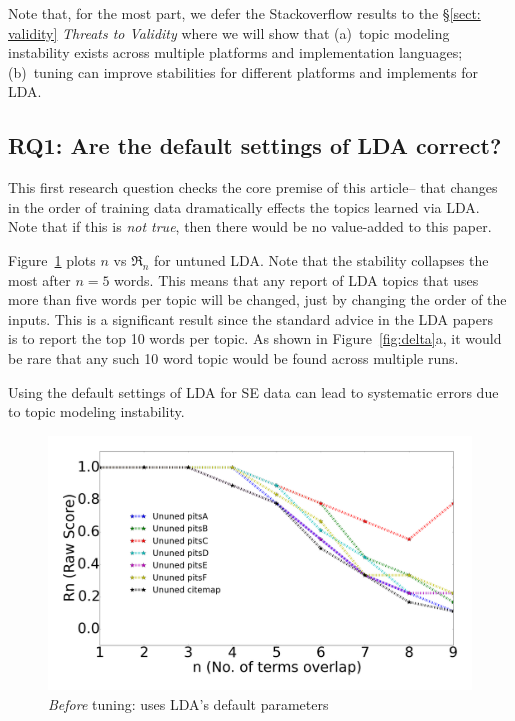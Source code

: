 \documentclass[10pt,conference]{IEEEtran}
\theoremstyle{break}
\begin{document}
  Note that, for the most part, we defer the Stackoverflow results to the \S\ref{sect: validity} {\em Threats to Validity} where we will show that (a)~topic modeling instability
  exists across multiple platforms and  implementation languages; (b)~tuning
  can improve stabilities for different platforms and implements for LDA.


\subsection{\textbf{RQ1: Are the default settings of LDA correct?}}


This first research question checks the core premise of this article-- that changes
in the order of training data dramatically effects the topics learned via LDA.
Note that if this is {\em not true}, then there would be no value-added to this paper.


Figure~\ref{fig:delta11}   plots $n$ vs $\Re_n$ for untuned  LDA.
Note that the  stability collapses the most after $n=5$ words. This means
  that any report of LDA topics that uses more than five words per topic will
  be changed, just by changing the order of the inputs. This is a significant result
  since the standard advice in the LDA papers~\cite{panichella2013effectively, lukins2010bug}
  is to report the top 10 words per topic. As shown in Figure~\ref{fig:delta}a, it would
  be rare that any such 10 word topic would be found across multiple runs.
  
 
\begin{lesson}
  Using the default settings of LDA for SE data can lead to systematic errors due to topic
  modeling instability. 
\end{lesson}

\begin{figure}[!h]
  \begin{center}
    \includegraphics[width=\linewidth]{./fig/Vem_untuned.png}
    \end{center}
  \caption{{\em Before} tuning: uses LDA's default parameters}\label{fig:delta11}  
\end{figure}
\end{document}
